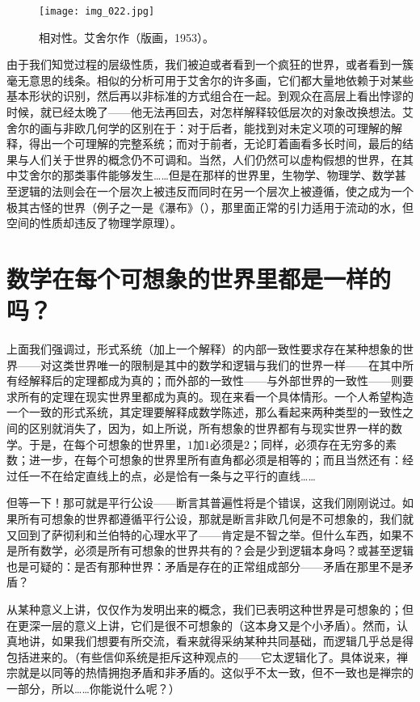 \begin{figure}
\texttt{[image: img\_022.jpg]}
\caption[相对性，艾舍尔作。]
  {相对性。艾舍尔作（版画，1953）。}
\end{figure}

由于我们知觉过程的层级性质，我们被迫或者看到一个疯狂的世界，或者看到一簇毫无意思的线条。相似的分析可用于艾舍尔的许多画，它们都大量地依赖于对某些基本形状的识别，然后再以非标准的方式组合在一起。到观众在高层上看出悖谬的时候，就已经太晚了——他无法再回去，对怎样解释较低层次的对象改换想法。艾舍尔的画与非欧几何学的区别在于：对于后者，能找到对未定义项的可理解的解释，得出一个可理解的完整系统；而对于前者，无论盯着画看多长时间，最后的结果与人们关于世界的概念仍不可调和。当然，人们仍然可以虚构假想的世界，在其中艾舍尔的那类事件能够发生……但是在那样的世界里，生物学、物理学、数学甚至逻辑的法则会在一个层次上被违反而同时在另一个层次上被遵循，使之成为一个极其古怪的世界（例子之一是《瀑布》（），那里面正常的引力适用于流动的水，但空间的性质却违反了物理学原理）。

\section{数学在每个可想象的世界里都是一样的吗？}

上面我们强调过，形式系统（加上一个解释）的内部一致性要求存在某种想象的世界——对这类世界唯一的限制是其中的数学和逻辑与我们的世界一样——在其中所有经解释后的定理都成为真的；而外部的一致性——与外部世界的一致性——则要求所有的定理在现实世界里都成为真的。现在来看一个具体情形。一个人希望构造一个一致的形式系统，其定理要解释成数学陈述，那么看起来两种类型的一致性之间的区别就消失了，因为，如上所说，所有想象的世界都有与现实世界一样的数学。于是，在每个可想象的世界里，$1$加$1$必须是$2$；同样，必须存在无穷多的素数；进一步，在每个可想象的世界里所有直角都必须是相等的；而且当然还有：经过任一不在给定直线上的点，必是恰有一条与之平行的直线……

但等一下！那可就是平行公设——断言其普遍性将是个错误，这我们刚刚说过。如果所有可想象的世界都遵循平行公设，那就是断言非欧几何是不可想象的，我们就又回到了萨彻利和兰伯特的心理水平了——肯定是不智之举。但什么车西，如果不是所有数学，必须是所有可想象的世界共有的？会是少到逻辑本身吗？或甚至逻辑也是可疑的：是否有那种世界：矛盾是存在的正常组成部分——矛盾在那里不是矛盾？

从某种意义上讲，仅仅作为发明出来的概念，我们已表明这种世界是可想象的；但在更深一层的意义上讲，它们是很不可想象的（这本身又是个小矛盾）。然而，认真地讲，如果我们想要有所交流，看来就得采纳某种共同基础，而逻辑几乎总是得包括进来的。（有些信仰系统是拒斥这种观点的——它太逻辑化了。具体说来，禅宗就是以同等的热情拥抱矛盾和非矛盾的。这似乎不太一致，但不一致也是禅宗的一部分，所以……你能说什么呢？）

